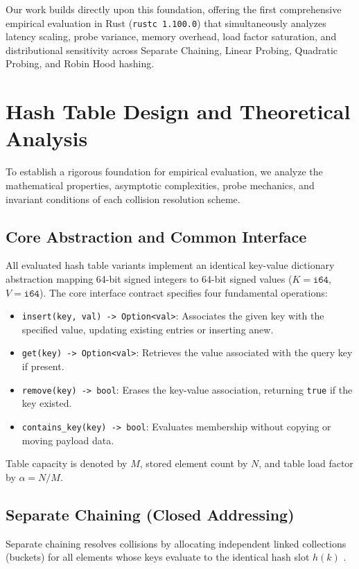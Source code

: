 \documentclass[conference]{IEEEtran}
\begin{document}
Our work builds directly upon this foundation, offering the first comprehensive empirical evaluation in Rust (\texttt{rustc 1.100.0}) that simultaneously analyzes latency scaling, probe variance, memory overhead, load factor saturation, and distributional sensitivity across Separate Chaining, Linear Probing, Quadratic Probing, and Robin Hood hashing.

\section{Hash Table Design and Theoretical Analysis}

To establish a rigorous foundation for empirical evaluation, we analyze the mathematical properties, asymptotic complexities, probe mechanics, and invariant conditions of each collision resolution scheme.

\subsection{Core Abstraction and Common Interface}

All evaluated hash table variants implement an identical key-value dictionary abstraction mapping 64-bit signed integers to 64-bit signed values ($K = \texttt{i64}$, $V = \texttt{i64}$). The core interface contract specifies four fundamental operations:
\begin{itemize}
  \item \texttt{insert(key, val) -> Option<val>}: Associates the given key with the specified value, updating existing entries or inserting anew.
  \item \texttt{get(key) -> Option<val>}: Retrieves the value associated with the query key if present.
  \item \texttt{remove(key) -> bool}: Erases the key-value association, returning \texttt{true} if the key existed.
  \item \texttt{contains\_key(key) -> bool}: Evaluates membership without copying or moving payload data.
\end{itemize}
Table capacity is denoted by $M$, stored element count by $N$, and table load factor by $\alpha = N / M$.

\subsection{Separate Chaining (Closed Addressing)}

Separate chaining resolves collisions by allocating independent linked collections (buckets) for all elements whose keys evaluate to the identical hash slot $h(k)$ \cite{knuth1998, clrs2022}.
\end{document}
